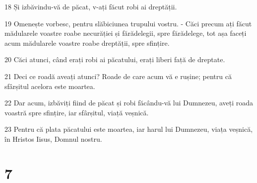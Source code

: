 \par 18 Și izbăvindu-vă de păcat, v-ați făcut robi ai dreptății.
\par 19 Omenește vorbesc, pentru slăbiciunea trupului vostru. - Căci precum ați făcut mădularele voastre roabe necurăției și fărădelegii, spre fărădelege, tot așa faceți acum mădularele voastre roabe dreptății, spre sfințire.
\par 20 Căci atunci, când erați robi ai păcatului, erați liberi față de dreptate.
\par 21 Deci ce roadă aveați atunci? Roade de care acum vă e rușine; pentru că sfârșitul acelora este moartea.
\par 22 Dar acum, izbăviți fiind de păcat și robi făcându-vă lui Dumnezeu, aveți roada voastră spre sfințire, iar sfârșitul, viață veșnică.
\par 23 Pentru că plata păcatului este moartea, iar harul lui Dumnezeu, viața veșnică, în Hristos Iisus, Domnul nostru.

\chapter{7}

